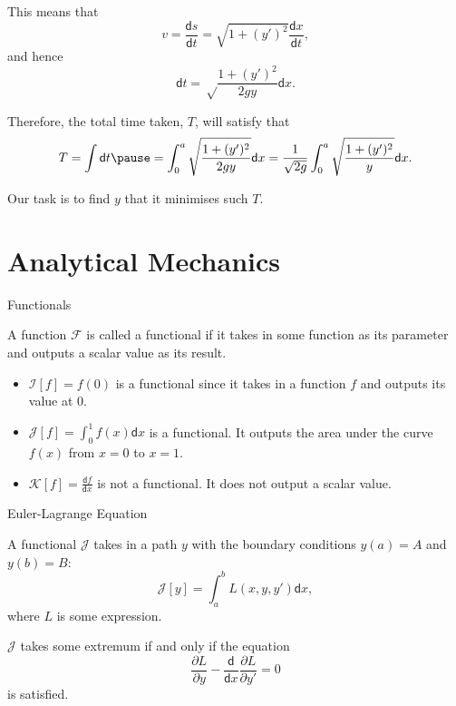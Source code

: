 \documentclass{beamer}
\newcommand{\diff}{\mathsf{d}}
\begin{document}
\begin{frame}
    This means that
    \[
        v = \frac{\diff s}{\diff t} = \sqrt{1 + (y')^2} \frac{\diff x}{\diff t},
    \] \pause
    and hence
    \[
        \diff t = \sqrt\frac{1+(y')^2}{2gy} \diff x.
    \] \pause

    Therefore, the total time taken, \(T\), will satisfy that
    \[
        T = \int \diff t \pause = \int_{0}^{a} \sqrt \frac{1 +(y')^2}{2gy} \diff x = \frac{1}{\sqrt{2g}} \int_{0}^{a} \sqrt \frac{1 +(y')^2}{y} \diff x.
    \] \pause

    Our task is to find \(y\) that it minimises such \(T\).
\end{frame}

\section{Analytical Mechanics}

\begin{frame}{Functionals} \pause
    \begin{definition}[Functional]
        A function \(\mathcal{F}\) is called a functional if it takes in some function as its parameter and outputs a scalar value as its result.
    \end{definition} \pause

    \begin{examples}
        \begin{itemize}
            \item \(\mathcal{I}[f] = f(0)\) \pause is a functional \pause since it takes in a function \(f\) and outputs its value at \(0\). \pause
            \item \(\mathcal{J}[f] = \int_{0}^{1} f(x) \diff x\) \pause is a functional. \pause It outputs the area under the curve \(f(x)\) from \(x = 0\) to \(x = 1\). \pause
            \item \(\mathcal{K}[f] = \frac{\diff f}{\diff x}\) \pause is not a functional. \pause It does not output a scalar value.
        \end{itemize}
    \end{examples}
\end{frame}

\begin{frame}{Euler-Lagrange Equation} \pause
    \begin{theorem}
        A functional \(\mathcal{J}\) takes in a path \(y\) with the boundary conditions \(y(a) = A\) and \(y(b) = B\):
        \[
            \mathcal{J}[y] = \int_{a}^{b} L(x, y, y') \diff x,
        \]
        where \(L\) is some expression. \pause

        \(\mathcal{J}\) takes some extremum if and only if the equation
        \[
            \frac{\partial L}{\partial y} - \frac{\diff}{\diff x}\frac{\partial L}{\partial y'} = 0
        \]
        is satisfied.
    \end{theorem}
\end{frame}
\end{document}
